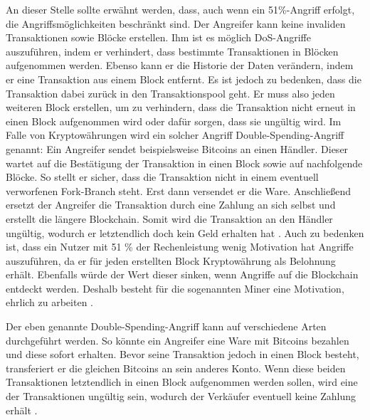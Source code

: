 An dieser Stelle sollte erwähnt werden, dass, auch wenn ein 51\%-Angriff erfolgt, die Angriffsmöglichkeiten beschränkt sind. Der Angreifer kann keine invaliden Transaktionen sowie Blöcke erstellen. Ihm ist es möglich DoS-Angriffe auszuführen, indem er verhindert, dass bestimmte Transaktionen in Blöcken aufgenommen werden. Ebenso kann er die Historie der Daten verändern, indem er eine Transaktion aus einem Block entfernt. Es ist jedoch zu bedenken, dass die Transaktion dabei zurück in den Transaktionspool geht. Er muss also jeden weiteren Block erstellen, um zu verhindern, dass die Transaktion nicht erneut in einen Block aufgenommen wird oder dafür sorgen, dass sie ungültig wird. Im Falle von Kryptowährungen wird ein solcher Angriff Double-Spending-Angriff genannt: Ein Angreifer sendet beispielsweise Bitcoins an einen Händler. Dieser wartet auf die Bestätigung der Transaktion in einen Block sowie auf nachfolgende Blöcke. So stellt er sicher, dass die Transaktion nicht in einem eventuell verworfenen Fork-Branch steht. Erst dann versendet er die Ware. Anschließend ersetzt der Angreifer die Transaktion durch eine Zahlung an sich selbst und erstellt die längere Blockchain. Somit wird die Transaktion an den Händler ungültig, wodurch er letztendlich doch kein Geld erhalten hat \cite{EthereumTeamEthereumWhitePaper2017}. Auch zu bedenken ist, dass ein Nutzer mit 51 \% der Rechenleistung wenig Motivation hat Angriffe auszuführen, da er für jeden erstellten Block Kryptowährung als Belohnung erhält. Ebenfalls würde der Wert dieser sinken, wenn Angriffe auf die Blockchain entdeckt werden. Deshalb besteht für die sogenannten Miner eine Motivation, ehrlich zu arbeiten \cite[S.196 ff.]{AntonopoulosMasteringbitcoin2015}.

Der eben genannte Double-Spending-Angriff kann auf verschiedene Arten durchgeführt werden. So könnte ein Angreifer eine Ware mit Bitcoins bezahlen und diese sofort erhalten. Bevor seine Transaktion jedoch in einen Block besteht, transferiert er die gleichen Bitcoins an sein anderes Konto. Wenn diese beiden Transaktionen letztendlich in einen Block aufgenommen werden sollen, wird eine der Transaktionen ungültig sein, wodurch der Verkäufer eventuell keine Zahlung erhält \cite[S.~211 ff.]{AntonopoulosMasteringbitcoin2015}.

